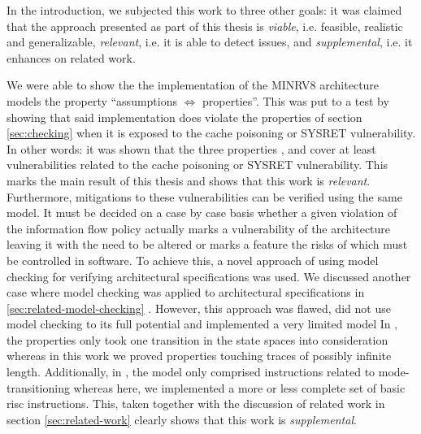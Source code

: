 In the introduction, we subjected this work to three other goals: it was claimed that the approach presented as part of this thesis is \textit{viable}, i.e. feasible, realistic and generalizable, \textit{relevant}, i.e. it is able to detect issues, and \textit{supplemental}, i.e. it enhances on related work.

We were able to show the the implementation of the MINRV8 architecture models the property \enquote{assumptions $ \Leftrightarrow $ properties}.
This was put to a test by showing that said implementation does violate the properties of section \ref{sec:checking} when it is exposed to the cache poisoning or SYSRET vulnerability.
In other words: it was shown that the three properties ,  and  cover at least vulnerabilities related to the cache poisoning or SYSRET vulnerability.
This marks the main result of this thesis and shows that this work is \textit{relevant}.
Furthermore, mitigations to these vulnerabilities can be verified using the same model.
It must be decided on a case by case basis whether a given violation of the information flow policy actually marks a vulnerability of the architecture leaving it with the need to be altered or marks a feature the risks of which must be controlled in software.
To achieve this, a novel approach of using model checking for verifying architectural specifications was used.
We discussed another case where model checking was applied to architectural specifications in \ref{sec:related-model-checking} \cite{BradfieldS16}.
However, this approach was flawed, did not use model checking to its full potential and implemented a very limited model
In \cite{BradfieldS16}, the properties only took one transition in the state spaces into consideration whereas in this work we proved properties touching traces of possibly infinite length.
Additionally, in \cite{BradfieldS16}, the model only comprised instructions related to mode-transitioning whereas here, we implemented a more or less complete set of basic \gls{risc} instructions.
This, taken together with the discussion of related work in section \ref{sec:related-work} clearly shows that this work is \textit{supplemental}.

